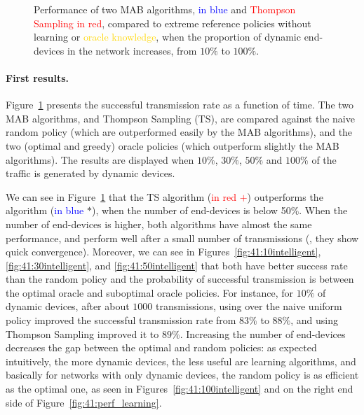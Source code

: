 \begin{figure}[!h]
{    \label{fig:41:100intelligent}}
    \caption[Performance of two MAB algorithms, \UCB{} and Thompson Sampling in red, compared to extreme reference policies without learning or oracle knowledge, when the proportion of dynamic end-devices in the network increases, from $10\%$ to $100\%$.]{Performance of two MAB algorithms, \textcolor{blue}{\UCB{} in blue} and \textcolor{red}{Thompson Sampling in red}, compared to extreme reference policies without learning or \textcolor{gold}{oracle knowledge}, when the proportion of dynamic end-devices in the network increases, from $10\%$ to $100\%$.}
    \label{fig:41:from10to100}
    \vspace*{-10pt}
\end{figure}


\paragraph{First results.}
%
Figure~\ref{fig:41:from10to100} presents the successful transmission rate as a function of time.
The two MAB algorithms, \UCB{} and Thompson Sampling (TS), are compared against the naive random policy (which are outperformed easily by the MAB algorithms), and the two (optimal and greedy) oracle policies (which outperform slightly the MAB algorithms).
The results are displayed when $10\%$, $30\%$, $50\%$ and $100\%$ of the traffic is generated by dynamic devices.


We can see in Figure~\ref{fig:41:from10to100} that the TS algorithm (\textcolor{red}{in red $+$}) outperforms the \UCB{} algorithm (\textcolor{blue}{in blue} $*$), when the number of end-devices is below 50\%. When the number of end-devices is higher, both algorithms have almost the same performance, and perform well after a small number of transmissions (\ie, they show quick convergence).
Moreover, we can see in Figures~\ref{fig:41:10intelligent}, \ref{fig:41:30intelligent}, and \ref{fig:41:50intelligent} that both have better success rate than the random policy and the probability of successful transmission is between the optimal oracle and suboptimal oracle policies.
For instance, for $10\%$ of dynamic devices, after about $1000$ transmissions, using \UCB{} over the naive uniform policy improved the successful transmission rate from $83\%$ to $88\%$, and using Thompson Sampling improved it to $89\%$.
Increasing the number of end-devices decreases the gap between the optimal and random policies:
as expected intuitively, the more dynamic devices, the less useful are learning algorithms, and basically for networks with only dynamic devices, the random policy is as efficient as the optimal one, as seen in Figures~\ref{fig:41:100intelligent} and on the right end side of Figure~\ref{fig:41:perf_learning}.

